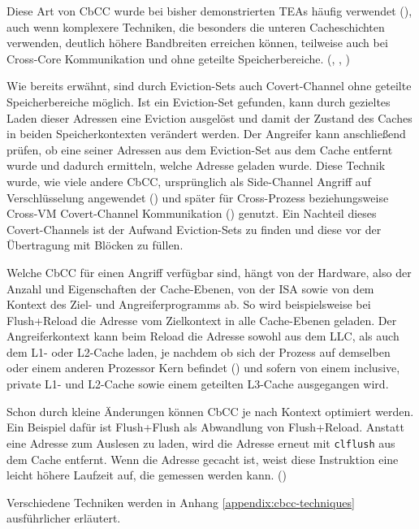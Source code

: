 Diese Art von \ac{CbCC} wurde bei bisher demonstrierten
\acp{TEA} häufig verwendet (\cite[23]{xiong_survey_2022}), auch wenn
komplexere Techniken, die besonders die unteren Cacheschichten
verwenden, deutlich höhere Bandbreiten erreichen können,
teilweise auch bei Cross-Core Kommunikation und ohne geteilte
Speicherbereiche.
(\cite[13]{almgren_c5_2015}, \cite[10]{wang_bandwidthbreach_2023},
\cite[5]{rauscher_systematic_2025})

Wie bereits erwähnt, sind durch Eviction-Sets auch Covert-Channel
ohne geteilte Speicherbereiche möglich. Ist ein Eviction-Set
gefunden, kann durch gezieltes Laden dieser Adressen eine
Eviction ausgelöst und damit der Zustand des Caches in beiden
Speicherkontexten verändert werden. Der Angreifer kann anschließend
prüfen, ob eine seiner Adressen aus dem Eviction-Set aus dem Cache
entfernt wurde und dadurch ermitteln, welche Adresse geladen wurde.
Diese Technik wurde, wie viele andere \ac{CbCC}, ursprünglich als
Side-Channel Angriff auf Verschlüsselung angewendet
(\cite[10-13]{hutchison_cache_2006}) und später für Cross-Prozess
beziehungsweise Cross-VM Covert-Channel Kommunikation
(\cite[620]{liu_last-level_2015}) genutzt. Ein Nachteil dieses
Covert-Channels ist der Aufwand Eviction-Sets zu finden und diese
vor der Übertragung mit Blöcken zu füllen.

Welche \ac{CbCC} für einen Angriff verfügbar sind, hängt von der
Hardware, also der Anzahl und Eigenschaften der Cache-Ebenen, von der
\ac{ISA} sowie von dem Kontext des Ziel- und Angreiferprogramms ab. So
wird beispielsweise bei Flush+Reload die Adresse vom Zielkontext in
alle Cache-Ebenen geladen. Der Angreiferkontext kann beim Reload
die Adresse sowohl aus dem \ac{LLC}, als auch dem L1- oder L2-Cache
laden, je nachdem ob sich der Prozess auf demselben oder einem
anderen Prozessor Kern befindet (\cite[23]{xiong_survey_2022}) und
sofern von einem inclusive, private L1- und L2-Cache sowie einem
geteilten L3-Cache ausgegangen wird.

Schon durch kleine Änderungen können \ac{CbCC} je nach Kontext
optimiert werden. Ein Beispiel dafür ist Flush+Flush
als Abwandlung von Flush+Reload.
Anstatt eine Adresse zum Auslesen zu laden, wird die Adresse erneut
mit \verb|clflush| aus dem Cache entfernt. Wenn die Adresse gecacht
ist, weist diese Instruktion eine leicht höhere Laufzeit auf, die
gemessen werden kann. (\cite[4]{caballero_flushflush_2016})

Verschiedene Techniken werden in Anhang
\ref{appendix:cbcc-techniques} ausführlicher erläutert.
